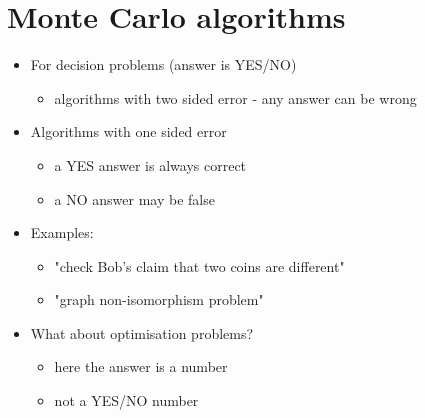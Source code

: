 \documentclass{article}[18pt]
\begin{document}
\section{Monte Carlo algorithms}
\begin{itemize}
	\item For decision problems (answer is YES/NO)
	\begin{itemize}
		\item algorithms with two sided error - any answer can be wrong
	\end{itemize}
	\item Algorithms with one sided error
	\begin{itemize}
		\item a YES answer is always correct
		\item a NO answer may be false
	\end{itemize}
	\item Examples:
	\begin{itemize}
		\item "check Bob's claim that two coins are different"
		\item "graph non-isomorphism problem"
	\end{itemize}
	\item What about optimisation problems?
	\begin{itemize}
		\item here the answer is a number
		\item not a YES/NO number
	\end{itemize}
\end{itemize}
\end{document}
